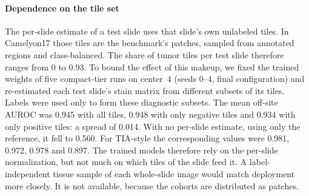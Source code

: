 \paragraph{Dependence on the tile set} The per-slide estimate of a test slide
uses that slide's own unlabeled tiles. In Camelyon17 those tiles are the
benchmark's patches, sampled from annotated regions and class-balanced. The
share of tumor tiles per test slide therefore ranges from 0 to 0.93. To bound
the effect of this makeup, we fixed the trained weights of five compact-tier
runs on center~4 (seeds 0--4, final configuration) and re-estimated each test
slide's stain matrix from different subsets of its tiles. Labels were used only
to form these diagnostic subsets. The mean off-site AUROC was 0.945 with all
tiles, 0.948 with only negative tiles and 0.934 with only positive tiles: a
spread of 0.014. With no per-slide estimate, using only the reference, it fell
to 0.560. For TIA-style the corresponding values were 0.981, 0.972, 0.978 and
0.897. The trained models therefore rely on the per-slide normalization, but
not much on which tiles of the slide feed it. A label-independent tissue sample
of each whole-slide image would match deployment more closely. It is not
available, because the cohorts are distributed as patches.
